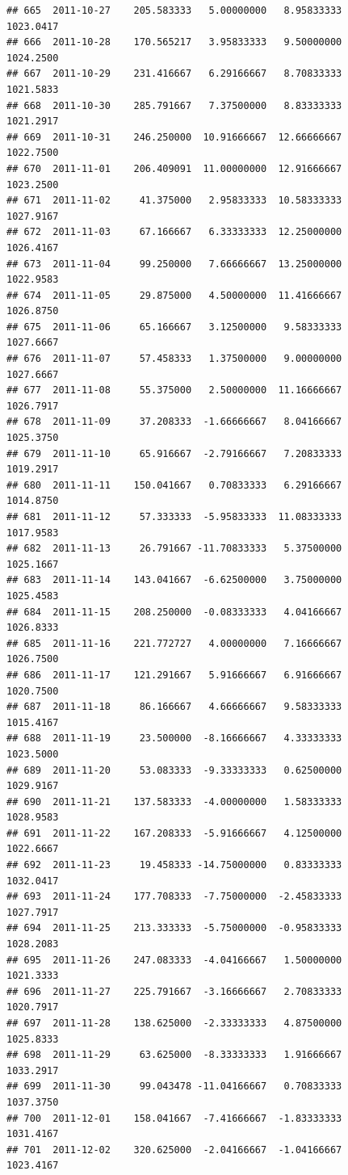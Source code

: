 \documentclass[
]{article}
\begin{document}
\begin{verbatim}
## 665  2011-10-27    205.583333   5.00000000   8.95833333    1023.0417
## 666  2011-10-28    170.565217   3.95833333   9.50000000    1024.2500
## 667  2011-10-29    231.416667   6.29166667   8.70833333    1021.5833
## 668  2011-10-30    285.791667   7.37500000   8.83333333    1021.2917
## 669  2011-10-31    246.250000  10.91666667  12.66666667    1022.7500
## 670  2011-11-01    206.409091  11.00000000  12.91666667    1023.2500
## 671  2011-11-02     41.375000   2.95833333  10.58333333    1027.9167
## 672  2011-11-03     67.166667   6.33333333  12.25000000    1026.4167
## 673  2011-11-04     99.250000   7.66666667  13.25000000    1022.9583
## 674  2011-11-05     29.875000   4.50000000  11.41666667    1026.8750
## 675  2011-11-06     65.166667   3.12500000   9.58333333    1027.6667
## 676  2011-11-07     57.458333   1.37500000   9.00000000    1027.6667
## 677  2011-11-08     55.375000   2.50000000  11.16666667    1026.7917
## 678  2011-11-09     37.208333  -1.66666667   8.04166667    1025.3750
## 679  2011-11-10     65.916667  -2.79166667   7.20833333    1019.2917
## 680  2011-11-11    150.041667   0.70833333   6.29166667    1014.8750
## 681  2011-11-12     57.333333  -5.95833333  11.08333333    1017.9583
## 682  2011-11-13     26.791667 -11.70833333   5.37500000    1025.1667
## 683  2011-11-14    143.041667  -6.62500000   3.75000000    1025.4583
## 684  2011-11-15    208.250000  -0.08333333   4.04166667    1026.8333
## 685  2011-11-16    221.772727   4.00000000   7.16666667    1026.7500
## 686  2011-11-17    121.291667   5.91666667   6.91666667    1020.7500
## 687  2011-11-18     86.166667   4.66666667   9.58333333    1015.4167
## 688  2011-11-19     23.500000  -8.16666667   4.33333333    1023.5000
## 689  2011-11-20     53.083333  -9.33333333   0.62500000    1029.9167
## 690  2011-11-21    137.583333  -4.00000000   1.58333333    1028.9583
## 691  2011-11-22    167.208333  -5.91666667   4.12500000    1022.6667
## 692  2011-11-23     19.458333 -14.75000000   0.83333333    1032.0417
## 693  2011-11-24    177.708333  -7.75000000  -2.45833333    1027.7917
## 694  2011-11-25    213.333333  -5.75000000  -0.95833333    1028.2083
## 695  2011-11-26    247.083333  -4.04166667   1.50000000    1021.3333
## 696  2011-11-27    225.791667  -3.16666667   2.70833333    1020.7917
## 697  2011-11-28    138.625000  -2.33333333   4.87500000    1025.8333
## 698  2011-11-29     63.625000  -8.33333333   1.91666667    1033.2917
## 699  2011-11-30     99.043478 -11.04166667   0.70833333    1037.3750
## 700  2011-12-01    158.041667  -7.41666667  -1.83333333    1031.4167
## 701  2011-12-02    320.625000  -2.04166667  -1.04166667    1023.4167

\end{verbatim}
\end{document}
